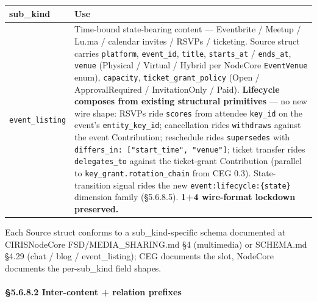 \documentclass[10pt]{article}
\begin{document}
{\footnotesize
\begin{longtable}{|p{8.0cm}|p{8.0cm}|}\hline
\textbf{sub\_kind} & \textbf{Use} \\ \hline\endhead
\texttt{event\_listing} & Time-bound state-bearing content — Eventbrite / Meetup / Lu.ma / calendar invites / RSVPs / ticketing. Source struct carries \texttt{platform}, \texttt{event\_id}, \texttt{title}, \texttt{starts\_at} / \texttt{ends\_at}, \texttt{venue} (Physical / Virtual / Hybrid per NodeCore \texttt{EventVenue} enum), \texttt{capacity}, \texttt{ticket\_grant\_policy} (Open / ApprovalRequired / InvitationOnly / Paid). \textbf{Lifecycle composes from existing structural primitives} — no new wire shape: RSVPs ride \texttt{scores} from attendee \texttt{key\_id} on the event's \texttt{entity\_key\_id}; cancellation rides \texttt{withdraws} against the event Contribution; reschedule rides \texttt{supersedes} with \texttt{differs\_in: ["start\_time", "venue"]}; ticket transfer rides \texttt{delegates\_to} against the ticket-grant Contribution (parallel to \texttt{key\_grant.rotation\_chain} from CEG 0.3). State-transition signal rides the new \texttt{event:lifecycle:\{state\}} dimension family (§5.6.8.5). \textbf{1+4 wire-format lockdown preserved.} \\ \hline
\end{longtable}}


Each Source struct conforms to a sub\_kind-specific schema documented at CIRISNodeCore FSD/MEDIA\_SHARING.md §4 (multimedia) or SCHEMA.md §4.29 (chat / blog / event\_listing); CEG documents the slot, NodeCore documents the per-sub\_kind field shapes.


\paragraph{§5.6.8.2 Inter-content + relation prefixes}\mbox{}\\
\end{document}
